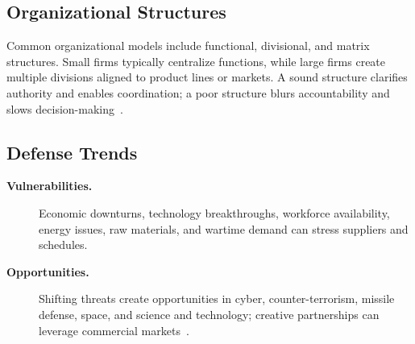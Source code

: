 \documentclass[../main.tex]{subfiles}
\begin{document}
\subsection{Organizational Structures}
Common organizational models include functional, divisional, and matrix structures. Small firms typically centralize functions, while large firms create multiple divisions aligned to product lines or markets. A sound structure clarifies authority and enables coordination; a poor structure blurs accountability and slows decision-making~\autocite{edo-3-3-1-acq-policy-players-2025}.

\subsection{Defense Trends}
\begin{description}
  \item[\textbf{Vulnerabilities.}] Economic downturns, technology breakthroughs, workforce availability, energy issues, raw materials, and wartime demand can stress suppliers and schedules.
  \item[\textbf{Opportunities.}] Shifting threats create opportunities in cyber, counter-terrorism, missile defense, space, and science and technology; creative partnerships can leverage commercial markets~\autocite{edo-3-3-1-acq-policy-players-2025}.
\end{description}
\end{document}
